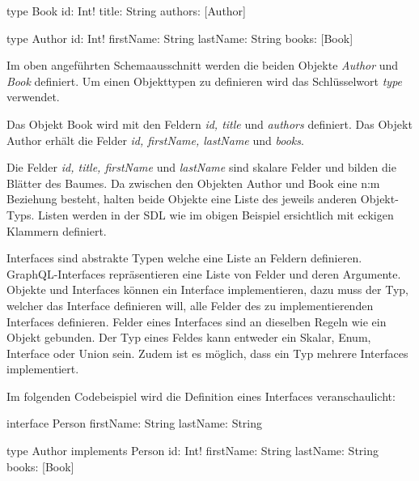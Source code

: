 \begin{JsCode}
type Book {
    id: Int!
    title: String
    authors: [Author]
}
    
type Author {
    id: Int!
    firstName: String
    lastName: String
    books: [Book]
}
\end{JsCode}

Im oben angeführten Schemaausschnitt werden die beiden Objekte \textit{Author} und \textit{Book} definiert.
Um einen Objekttypen zu definieren wird das Schlüsselwort \textit{type} verwendet.

Das Objekt Book wird mit den Feldern \textit{id, title} und \textit{authors} definiert.
Das Objekt Author erhält die Felder \textit{id, firstName, lastName} und \textit{books}.

Die Felder \textit{id, title, firstName} und \textit{lastName} sind skalare Felder und bilden die Blätter des Baumes.
Da zwischen den Objekten Author und Book eine n:m Beziehung besteht, halten beide Objekte eine Liste des jeweils anderen Objekt-Typs.
Listen werden in der SDL wie im obigen Beispiel ersichtlich mit eckigen Klammern definiert.

Interfaces sind abstrakte Typen welche eine Liste an Feldern definieren.
GraphQL-Interfaces repräsentieren eine Liste von Felder und deren Argumente.
Objekte und Interfaces können ein Interface implementieren, dazu muss der Typ, welcher das Interface definieren will, alle Felder des zu implementierenden Interfaces definieren.
\newline
\parencite[Abs. 3.7]{graphqlOnline}
Felder eines Interfaces sind an dieselben Regeln wie ein Objekt gebunden.
Der Typ eines Feldes kann entweder ein Skalar, Enum, Interface oder Union sein.
Zudem ist es möglich, dass ein Typ mehrere Interfaces implementiert.
\parencite[S.65-66]{kress2020graphql}
\newline


Im folgenden Codebeispiel wird die Definition eines Interfaces veranschaulicht:

\begin{JsCode}
interface Person {
    firstName: String
    lastName: String
}

type Author implements Person {
    id: Int!
    firstName: String
    lastName: String
    books: [Book]
}
\end{JsCode}

